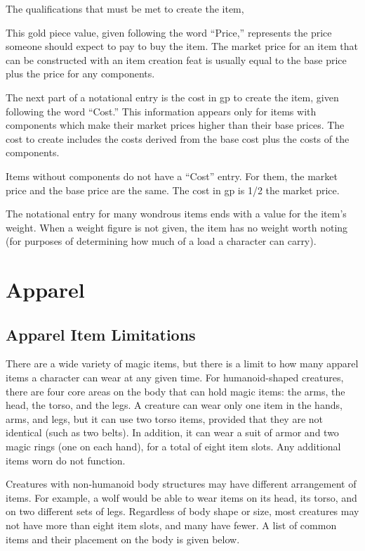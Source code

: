  The qualifications that must be met to create the item, %

 This gold piece value, given following the word ``Price,'' represents the price someone should expect to pay to buy the item.
The market price for an item that can be constructed with an item creation feat is usually equal to the base price plus the price for any components.

 The next part of a notational entry is the cost in gp to create the item, given following the word ``Cost.'' This information appears only for items with components which make their market prices higher than their base prices.
The cost to create includes the costs derived from the base cost plus the costs of the components.

Items without components do not have a ``Cost'' entry.
For them, the market price and the base price are the same.
The cost in gp is 1/2 the market price.

 The notational entry for many wondrous items ends with a value for the item's weight.
When a weight figure is not given, the item has no weight worth noting (for purposes of determining how much of a load a character can carry).

\section{Apparel}

\subsection{Apparel Item Limitations}

There are a wide variety of magic items, but there is a limit to how many apparel items a character can wear at any given time.
For humanoid-shaped creatures, there are four core areas on the body that can hold magic items: the arms, the head, the torso, and the legs.
A creature can wear only one item in the hands, arms, and legs, but it can use two torso items, provided that they are not identical (such as two belts).
In addition, it can wear a suit of armor and two magic rings (one on each hand), for a total of eight item slots.
Any additional items worn do not function.

Creatures with non-humanoid body structures may have different arrangement of items.
For example, a wolf would be able to wear items on its head, its torso, and on two different sets of legs.
Regardless of body shape or size, most creatures may not have more than eight item slots, and many have fewer.
A list of common items and their placement on the body is given below.


